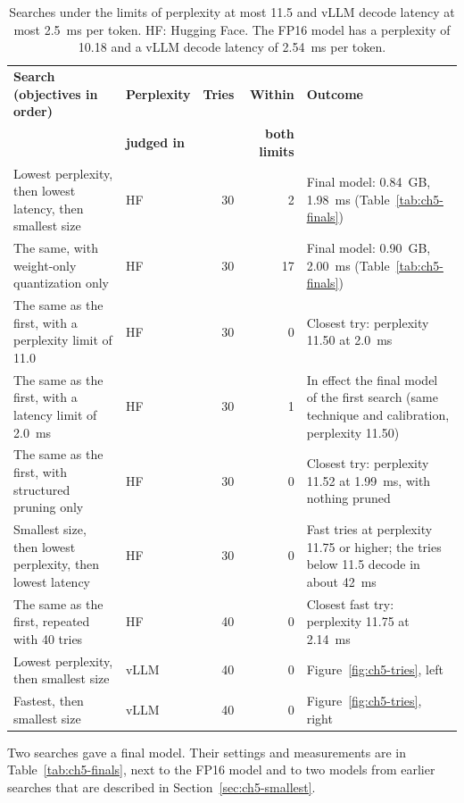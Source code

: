 \begin{table}[htbp]
\centering
\footnotesize
\caption{Searches under the limits of perplexity at most 11.5 and vLLM decode latency at most 2.5~ms per token. HF: Hugging Face. The FP16 model has a perplexity of 10.18 and a vLLM decode latency of 2.54~ms per token.}
\label{tab:ch5-searches}
\renewcommand{\arraystretch}{1.2}
\begin{tabularx}{\textwidth}{>{\raggedright\arraybackslash}p{4.3cm}lrr>{\raggedright\arraybackslash}X}
\hline
\textbf{Search (objectives in order)} & \textbf{Perplexity} & \textbf{Tries} & \textbf{Within} & \textbf{Outcome} \\
 & \textbf{judged in} & & \textbf{both limits} & \\
\hline
Lowest perplexity, then lowest latency, then smallest size & HF & 30 & 2 & Final model: 0.84~GB, 1.98~ms (Table~\ref{tab:ch5-finals}) \\
The same, with weight-only quantization only & HF & 30 & 17 & Final model: 0.90~GB, 2.00~ms (Table~\ref{tab:ch5-finals}) \\
The same as the first, with a perplexity limit of 11.0 & HF & 30 & 0 & Closest try: perplexity 11.50 at 2.0~ms \\
The same as the first, with a latency limit of 2.0~ms & HF & 30 & 1 & In effect the final model of the first search (same technique and calibration, perplexity 11.50) \\
The same as the first, with structured pruning only & HF & 30 & 0 & Closest try: perplexity 11.52 at 1.99~ms, with nothing pruned \\
Smallest size, then lowest perplexity, then lowest latency & HF & 30 & 0 & Fast tries at perplexity 11.75 or higher; the tries below 11.5 decode in about 42~ms \\
The same as the first, repeated with 40 tries & HF & 40 & 0 & Closest fast try: perplexity 11.75 at 2.14~ms \\
Lowest perplexity, then smallest size & vLLM & 40 & 0 & Figure~\ref{fig:ch5-tries}, left \\
Fastest, then smallest size & vLLM & 40 & 0 & Figure~\ref{fig:ch5-tries}, right \\
\hline
\end{tabularx}
\end{table}

Two searches gave a final model. Their settings and measurements are in Table~\ref{tab:ch5-finals}, next to the FP16 model and to two models from earlier searches that are described in Section~\ref{sec:ch5-smallest}.

